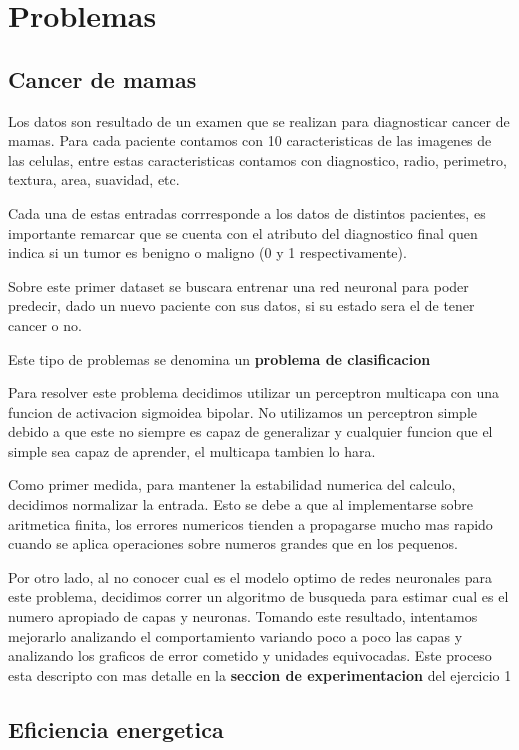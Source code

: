 \section{Problemas}
\subsection{Cancer de mamas}
Los datos son resultado de un examen que se realizan para diagnosticar cancer de mamas. Para cada paciente contamos con 10 caracteristicas de las imagenes de las celulas, entre estas caracteristicas contamos con diagnostico, radio, perimetro, textura, area, suavidad, etc. 

Cada una de estas entradas corrresponde a los datos de distintos pacientes, es importante remarcar que se cuenta con el atributo del diagnostico final quen indica si un tumor es benigno o maligno (0 y 1 respectivamente).

Sobre este primer dataset se buscara entrenar una red neuronal para poder predecir, dado un nuevo paciente con sus datos, si su estado sera el de tener cancer o no.

Este tipo de problemas se denomina un \textbf{problema de clasificacion}

Para resolver este problema decidimos utilizar un perceptron multicapa con una funcion de activacion sigmoidea bipolar. No utilizamos un perceptron simple debido a que este no siempre es capaz de generalizar y cualquier funcion que el simple sea capaz de aprender, el multicapa tambien lo hara.

Como primer medida, para mantener la estabilidad numerica del calculo, decidimos normalizar la entrada. Esto se debe a que al implementarse sobre aritmetica finita, los errores numericos tienden a propagarse mucho mas rapido cuando se aplica operaciones sobre numeros grandes que en los pequenos.

Por otro lado, al no conocer cual es el modelo optimo de redes neuronales para este problema, decidimos correr un algoritmo de busqueda para estimar cual es el numero apropiado de capas y neuronas. Tomando este resultado, intentamos mejorarlo analizando el comportamiento variando poco a poco las capas y analizando los graficos de error cometido y unidades equivocadas. Este proceso esta descripto con mas detalle en la \textbf{seccion de experimentacion} del ejercicio 1

\subsection{Eficiencia energetica}

